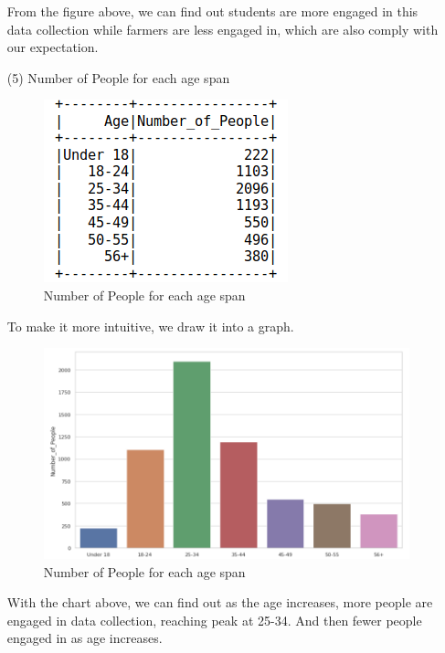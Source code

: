 \documentclass[two column]{article}
\begin{document}
\begin{itemize}
\par From the figure above, we can find out students are more engaged in this data collection while farmers are less engaged in, which are also comply with our expectation.


\item[(5)] Number of People for each age span

\begin{figure}[H]
\centering
\caption{Number of People for each age span}
\includegraphics[width = 0.95\linewidth]{age-distribution1.png}
\end{figure}

\par To make it more intuitive, we draw it into a graph.
\begin{figure}[H]
\centering
\caption{Number of People for each age span}
\includegraphics[width = 0.95\linewidth]{age-distribution2.png}
\end{figure}

\par With the chart above, we can find out as the age increases, more people are engaged in data collection, reaching peak at 25-34. And then fewer people engaged in as age increases.

\end{itemize}
\end{document}
